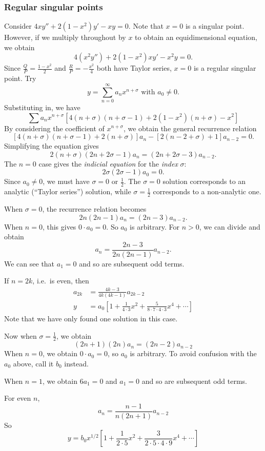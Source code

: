\documentclass[a4paper]{article}
\begin{document}
\subsubsection*{Regular singular points}
\begin{eg}
  Consider $4xy'' + 2(1 - x^2)y' - xy = 0$. Note that $x = 0$ is a singular point. However, if we multiply throughout by $x$ to obtain an equidimensional equation, we obtain
  \[
    4(x^2 y'') + 2(1 - x^2)xy' - x^2 y = 0.
  \]
  Since $\frac{Q}{P} = \frac{1 - x^2}{2}$ and $\frac{R}{P} = -\frac{x^2}{4}$ both have Taylor series, $x = 0$ is a regular singular point. Try
  \[
    y = \sum_{n = 0}^\infty a_n x^{n + \sigma}\text{ with }a_0 \not= 0.
  \]
  Substituting in, we have
  \[
    \sum a_n x^{n + \sigma}[4(n + \sigma)(n + \sigma - 1) + 2(1 - x^2)(n + \sigma) - x^2]
  \]
  By considering the coefficient of $x^{n + \sigma}$, we obtain the general recurrence relation
  \[
    [4(n + \sigma)(n + \sigma - 1) + 2(n + \sigma)]a_n -[2(n - 2 + \sigma) + 1]a_{n - 2} = 0.
  \]
  Simplifying the equation gives
  \[
    2(n + \sigma)(2n + 2\sigma - 1)a_n = (2n + 2\sigma-3)a_{n - 2}.
  \]
  The $n = 0$ case gives the \emph{indicial equation} for the \emph{index} $\sigma$:
  \[
    2\sigma(2\sigma - 1)a_0 = 0.
  \]
  Since $a_0 \not= 0$, we must have $\sigma = 0$ or $\frac{1}{2}$. The $\sigma = 0$ solution corresponds to an analytic (``Taylor series'') solution, while $\sigma = \frac{1}{2}$ corresponds to a non-analytic one.

  When $\sigma = 0$, the recurrence relation becomes
  \[
    2n(2n - 1)a_n = (2n - 3)a_{n - 2}.
  \]
  When $n = 0$, this gives $0\cdot a_0 = 0$. So $a_0$ is arbitrary. For $n >0$, we can divide and obtain
  \[
    a_n = \frac{2n - 3}{2n(2n - 1)}a_{n - 2}.
  \]
  We can see that $a_1 = 0$ and so are subsequent odd terms.

  If $n = 2k$, i.e.\ is even, then
  \begin{align*}
    a_{2k} &= \frac{4k - 3}{4k(4k - 1)}a_{2k - 2}\\
    y &= a_0\left[1 + \frac{1}{4\cdot 3}x^2 + \frac{5}{8\cdot 7\cdot 4\cdot 3}x^4 + \cdots\right]
  \end{align*}
  Note that we have only found one solution in this case.

  Now when $\sigma = \frac{1}{2}$, we obtain
  \[
    (2n + 1)(2n)a_n = (2n - 2)a_{n - 2}
  \]
  When $n = 0$, we obtain $0\cdot a_0 = 0$, so $a_0$ is arbitrary. To avoid confusion with the $a_0$ above, call it $b_0$ instead.

  When $n = 1$, we obtain $6a_1 = 0$ and $a_1 = 0$ and so are subsequent odd terms.

  For even $n$,
  \[
    a_n = \frac{n - 1}{n(2n + 1)}a_{n - 2}
  \]
  So
  \[
    y = b_0 x^{1/2}\left[1 + \frac{1}{2\cdot 5}x^2 + \frac{3}{2\cdot 5\cdot 4\cdot 9}x^4 + \cdots\right]
  \]
\end{eg}
\end{document}
